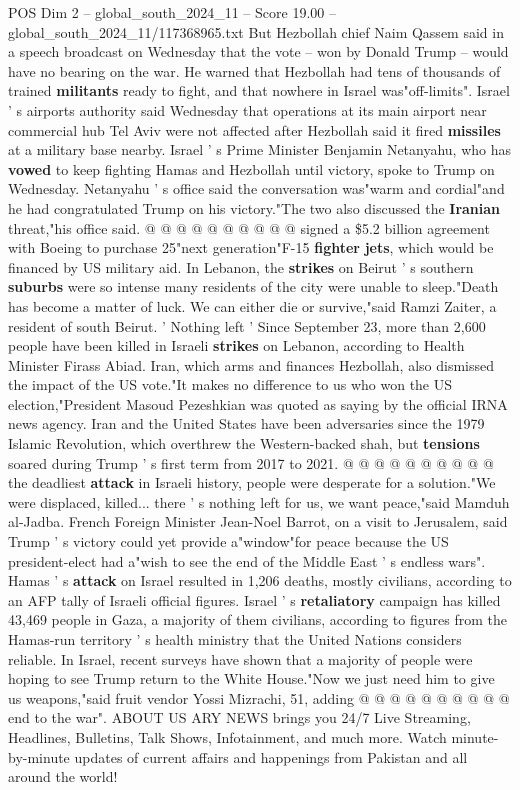 \begin{textsample}{POS Dim 2 – global\_south\_2024\_11 – Score 19.00 – global\_south\_2024\_11/117368965.txt}
But Hezbollah chief Naim Qassem said in a speech broadcast on Wednesday that the vote -- won by Donald Trump -- would have no bearing on the war.
He warned that Hezbollah had tens of thousands of trained \textbf{militants} ready to fight, and that nowhere in Israel was"off-limits".
Israel ' s airports authority said Wednesday that operations at its main airport near commercial hub Tel Aviv were not affected after Hezbollah said it fired \textbf{missiles} at a military base nearby.
Israel ' s Prime Minister Benjamin Netanyahu, who has \textbf{vowed} to keep fighting Hamas and Hezbollah until victory, spoke to Trump on Wednesday.
Netanyahu ' s office said the conversation was"warm and cordial"and he had congratulated Trump on his victory."The two also discussed the \textbf{Iranian} threat,"his office said. @ @ @ @ @ @ @ @ @ @ signed a \$5.2 billion agreement with Boeing to purchase 25"next generation"F-15 \textbf{fighter} \textbf{jets}, which would be financed by US military aid.
In Lebanon, the \textbf{strikes} on Beirut ' s southern \textbf{suburbs} were so intense many residents of the city were unable to sleep."Death has become a matter of luck.
We can either die or survive,"said Ramzi Zaiter, a resident of south Beirut. ' Nothing left ' Since September 23, more than 2,600 people have been killed in Israeli \textbf{strikes} on Lebanon, according to Health Minister Firass Abiad.
Iran, which arms and finances Hezbollah, also dismissed the impact of the US vote."It makes no difference to us who won the US election,"President Masoud Pezeshkian was quoted as saying by the official IRNA news agency.
Iran and the United States have been adversaries since the 1979 Islamic Revolution, which overthrew the Western-backed shah, but \textbf{tensions} soared during Trump ' s first term from 2017 to 2021. @ @ @ @ @ @ @ @ @ @ the deadliest \textbf{attack} in Israeli history, people were desperate for a solution."We were displaced, killed... there ' s nothing left for us, we want peace,"said Mamduh al-Jadba.
French Foreign Minister Jean-Noel Barrot, on a visit to Jerusalem, said Trump ' s victory could yet provide a"window"for peace because the US president-elect had a"wish to see the end of the Middle East ' s endless wars".
Hamas ' s \textbf{attack} on Israel resulted in 1,206 deaths, mostly civilians, according to an AFP tally of Israeli official figures.
Israel ' s \textbf{retaliatory} campaign has killed 43,469 people in Gaza, a majority of them civilians, according to figures from the Hamas-run territory ' s health ministry that the United Nations considers reliable.
In Israel, recent surveys have shown that a majority of people were hoping to see Trump return to the White House."Now we just need him to give us weapons,"said fruit vendor Yossi Mizrachi, 51, adding @ @ @ @ @ @ @ @ @ @ end to the war".
ABOUT US ARY NEWS brings you 24/7 Live Streaming, Headlines, Bulletins, Talk Shows, Infotainment, and much more.
Watch minute-by-minute updates of current affairs and happenings from Pakistan and all around the world!

\end{textsample}
